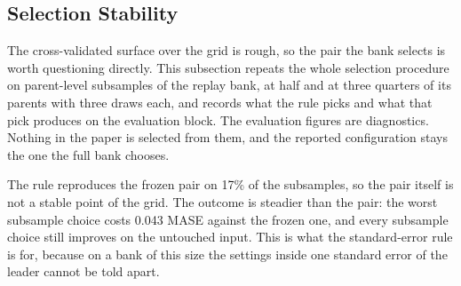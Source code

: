 \documentclass{article}
\begin{document}
\subsection{Selection Stability}
\label{app:selstability}
The cross-validated surface over the grid is rough, so the pair the bank selects is worth
questioning directly. This subsection repeats the whole selection procedure on parent-level
subsamples of the replay bank, at half and at three quarters of its parents with three draws
each, and records what the rule picks and what that pick produces on the evaluation block. The
evaluation figures are diagnostics. Nothing in the paper is selected from them, and the
reported configuration stays the one the full bank chooses.

The rule reproduces the frozen pair on 17\% of the subsamples, so the pair itself is not a stable point of the grid. The outcome is steadier than the pair: the worst subsample choice costs 0.043 MASE against the frozen one, and every subsample choice still improves on the untouched input. This is what the standard-error rule is for, because on a bank of this size the settings inside one standard error of the leader cannot be told apart.
\end{document}
